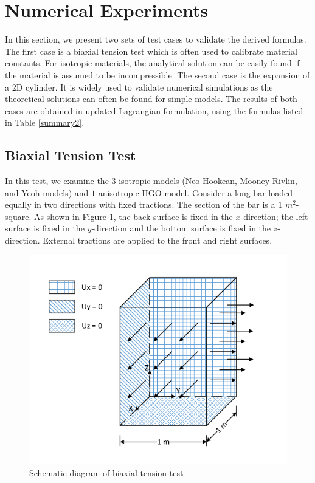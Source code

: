 \section{Numerical Experiments}
\label{experiments}
In this section, we present two sets of test cases to validate the derived formulas. The first case is a biaxial tension test which is often used to calibrate material constants. For isotropic materials, the analytical solution can be easily found if the material is assumed to be incompressible. The second case is the expansion of a $2$D cylinder. It is widely used to validate numerical simulations as the theoretical solutions can often be found for simple models. The results of both cases are obtained in updated Lagrangian formulation, using the formulas listed in Table \ref{summary2}.

\subsection{Biaxial Tension Test}
\label{biaxial_tension_test}
In this test, we examine the $3$ isotropic models (Neo-Hookean, Mooney-Rivlin, and Yeoh models) and $1$ anisotropic HGO model. Consider a long bar loaded equally in two directions with fixed tractions. The section of the bar is a $1$ $m^2$-square. As shown in Figure \ref{fig:biaxial_schematic}, the back surface is fixed in the $x$-direction; the left surface is fixed in the $y$-direction and the bottom surface is fixed in the $z$-direction. External tractions are applied to the front and right surfaces. 

\begin{figure}[H]
\centering
\includegraphics[width=.5\textwidth]{./figures/biaxial_schematic.png}
\caption{Schematic diagram of biaxial tension test}
\label{fig:biaxial_schematic}
\end{figure}


